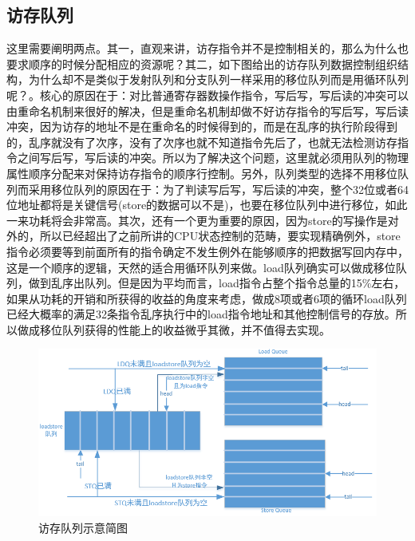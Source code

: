 \documentclass[11pt]{article}
\begin{document}
\subsection{访存队列}
这里需要阐明两点。其一，直观来讲，访存指令并不是控制相关的，那么为什么也要求顺序的时候分配相应的资源呢？其二，如下图给出的访存队列数据控制组织结构，为什么却不是类似于发射队列和分支队列一样采用的移位队列而是用循环队列呢？。核心的原因在于：对比普通寄存器数操作指令，写后写，写后读的冲突可以由重命名机制来很好的解决，但是重命名机制却做不好访存指令的写后写，写后读冲突，因为访存的地址不是在重命名的时候得到的，而是在乱序的执行阶段得到的，乱序就没有了次序，没有了次序也就不知道指令先后了，也就无法检测访存指令之间写后写，写后读的冲突。所以为了解决这个问题，这里就必须用队列的物理属性顺序分配来对保持访存指令的顺序行控制。另外，队列类型的选择不用移位队列而采用移位队列的原因在于：为了判读写后写，写后读的冲突，整个32位或者64位地址都将是关键信号(store的数据可以不是)，也要在移位队列中进行移位，如此一来功耗将会非常高。其次，还有一个更为重要的原因，因为store的写操作是对外的，所以已经超出了之前所讲的CPU状态控制的范畴，要实现精确例外，store指令必须要等到前面所有的指令确定不发生例外在能够顺序的把数据写回内存中，这是一个顺序的逻辑，天然的适合用循环队列来做。load队列确实可以做成移位队列，做到乱序出队列。但是因为平均而言，load指令占整个指令总量的15\%左右，如果从功耗的开销和所获得的收益的角度来考虑，做成8项或者6项的循环load队列已经大概率的满足32条指令乱序执行中的load指令地址和其他控制信号的存放。所以做成移位队列获得的性能上的收益微乎其微，并不值得去实现。
\begin{figure}[H]
	\centering
	\includegraphics[width=0.7\linewidth]{figs/loadstqueue.png}
	\caption{访存队列示意简图}
\end{figure}
\end{document}
